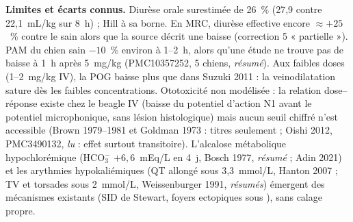 \documentclass[10pt,a4paper]{article}
\newcommand{\vp}[1]{\text{\texttt{\detokenize{#1}}}}
\newcommand{\acc}[1]{\textsl{#1}}
\newcommand{\limite}[1]{\par\textbf{Limites et écarts connus.} #1}
\begin{document}
\limite{Diurèse orale surestimée de 26~\% (27,9 contre 22,1~mL/kg sur 8~h) ; Hill à sa borne. En MRC, diurèse effective encore $\approx +25$~\% contre le sain alors que la source décrit une baisse (correction 5 « partielle »). PAM du chien sain $-10$~\% environ à 1--2~h, alors qu'une étude ne trouve pas de baisse à 1~h après 5~mg/kg (PMC10357252, 5 chiens, \acc{résumé}). Aux faibles doses (1--2~mg/kg IV), la POG baisse plus que dans Suzuki 2011 : la veinodilatation sature dès les faibles concentrations. Ototoxicité non modélisée : la relation dose--réponse existe chez le beagle IV (baisse du potentiel d'action N1 avant le potentiel microphonique, sans lésion histologique) mais aucun seuil chiffré n'est accessible (Brown 1979--1981 et Goldman 1973 : titres seulement ; Oishi 2012, PMC3490132, \acc{lu} : effet surtout transitoire). L'alcalose métabolique hypochlorémique (HCO$_3^-$ $+6{,}6$~mEq/L en 4~j, Bosch 1977, \acc{résumé} ; Adin 2021) et les arythmies hypokaliémiques (QT allongé sous 3,3~mmol/L, Hanton 2007 ; TV et torsades sous 2~mmol/L, Weissenburger 1991, \acc{résumés}) émergent des mécanismes existants (SID de Stewart, foyers ectopiques sous \vp{k_vpc}), sans calage propre.}
\end{document}
